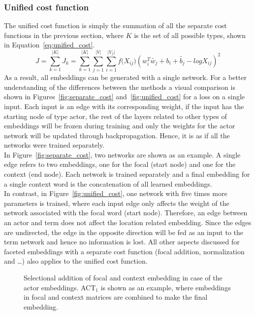 \subsubsection{Unified cost function  }
\label{sec:unified_cost}
The unified cost function is simply the summation of all the separate cost functions in the previous section, where $K$ is the set of all possible types, shown in Equation~\ref{eq:unified_cost}.
\begin{equation}
J=\sum _{ k=1 }^{ |K| }{J_k}=\sum _{ k=1 }^{ |K| }{}\sum _{ j=1 }^{ |V| }{}\sum _{ i=1 }^{ |V_f| }{ f({ X }_{ ij } } )(w_{ i }^{ T }\tilde{  w_{ j } } +b_{ i }+\tilde{  b_{ j } } -log{ X }_{ ij })^2
\label{eq:unified_cost}
\end{equation}
As a result, all embeddings can be generated with a single network. For a better understanding of the differences between the methods a visual comparison is shown in Figures~\ref{fig:separate_cost} and~\ref{fig:unified_cost} for a loss on a single input. Each input is an edge with its corresponding weight, if the input has the starting node of type actor, the rest of the layers related to other types of embeddings will be frozen during training and only the weights for the actor network will be updated through backpropagation. Hence, it is as if all the networks were trained separately.  \\
In Figure~\ref{fig:separate_cost}, two networks are shown as an example. A single edge refers to two embeddings, one for the focal (start node) and one for the context (end node). Each network is trained separately and a final embedding for a single context word is the concatenation of all learned embeddings. \\
In contrast, in Figure~\ref{fig:unified_cost}, one network with five times more parameters is trained, where each input edge only affects the weight of the network associated with the focal word (start node). Therefore, an edge between an actor and term does not affect the location related embedding. Since the edges are undirected, the edge in the opposite direction will be fed as an input to the term network and hence no information is lost. All other aspects discussed for faceted embeddings with a separate cost function (focal addition, normalization and \dots) also applies to the unified cost function.
\begin{figure}
{\small 
{} %

}
\caption{Selectional addition of focal and context embedding in case of the actor embeddings. ACT$_1$ is shown as an example, where embeddings in focal and context matrices are combined to make the final embedding.} \label{fig:focal_addition}
\end{figure}

